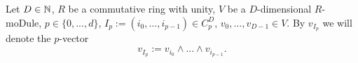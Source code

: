 \begin{notation}
  Let
    $D \in \mathbb{N}$,
    $R$ be a commutative ring with unity,
    $V$ be a $D$-dimensional $R$-moDule,
    $p \in \{0, ..., d\}$,
    $I_p := (i_0, ..., i_{p - 1}) \in C^D_p$,
    $v_0, ..., v_{D - 1} \in V$.
  By $v_{I_p}$ we will denote the $p$-vector
  \begin{equation}
    v_{I_p} := v_{i_0} \wedge ... \wedge v_{i_{p - 1}}.
  \end{equation}
\end{notation}
